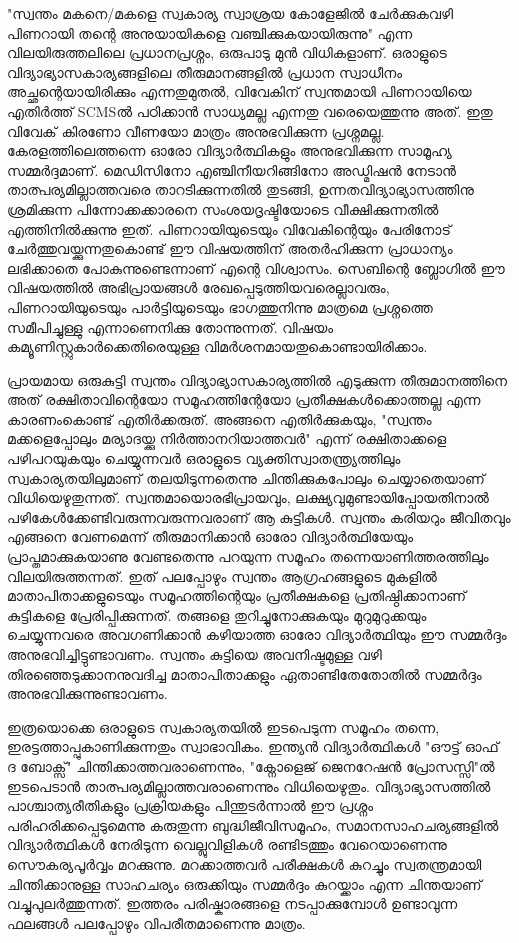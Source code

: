 "സ്വന്തം മകനെ/മകളെ സ്വകാര്യ സ്വാശ്രയ കോളേജില്‍ ചേര്‍ക്കുകവഴി പിണറായി തന്റെ അനുയായികളെ വഞ്ചിക്കുകയായിരുന്നു" എന്ന വിലയിരുത്തലിലെ പ്രധാനപ്രശ്നം, ഒരുപാടു മുന്‍ വിധികളാണ്. ഒരാളുടെ വിദ്യാഭ്യാസകാര്യങ്ങളിലെ തീരുമാനങ്ങളില്‍ പ്രധാന സ്വാധീനം അച്ഛന്റെയായിരിക്കും എന്നതുമുതല്‍, വിവേകിന് സ്വന്തമായി പിണറായിയെ എതിര്‍ത്ത് SCMSല്‍ പഠിക്കാന്‍ സാധ്യമല്ല എന്നതു വരെയെത്തുന്നു അത്. ഇതു വിവേക് കിരണോ വീണയോ മാത്രം അനുഭവിക്കുന്ന പ്രശ്നമല്ല. കേരളത്തിലെത്തന്നെ ഓരോ വിദ്യാര്‍ത്ഥികളും അനുഭവിക്കുന്ന സാമൂഹ്യ സമ്മര്‍ദ്ദമാണ്. മെഡിസിനോ എഞ്ചിനീയറിങ്ങിനോ അഡ്മിഷന്‍ നേടാന്‍ താത്പര്യമില്ലാത്തവരെ താറടിക്കുന്നതില്‍ തുടങ്ങി, ഉന്നതവിദ്യാഭ്യാസത്തിനു ശ്രമിക്കുന്ന പിന്നോക്കക്കാരനെ സംശയദൃഷ്ടിയോടെ വീക്ഷിക്കുന്നതില്‍ എത്തിനില്‍ക്കുന്നു ഇത്. പിണറായിയുടെയും വിവേകിന്റെയും പേരിനോട് ചേര്‍ത്തുവയ്ക്കുന്നതുകൊണ്ട് ഈ വിഷയത്തിന് അതര്‍ഹിക്കുന്ന പ്രാധാന്യം ലഭിക്കാതെ പോകുന്നുണ്ടെന്നാണ് എന്റെ വിശ്വാസം. സെബിന്റെ ബ്ലോഗില്‍ ഈ വിഷയത്തില്‍ അഭിപ്രായങ്ങള്‍ രേഖപ്പെടുത്തിയവരെല്ലാവരും, പിണറായിയുടെയും പാര്‍ട്ടിയുടെയും ഭാഗത്തുനിന്നു മാത്രമെ പ്രശ്നത്തെ സമീപിച്ചുള്ളു എന്നാണെനിക്കു തോന്നുന്നത്. വിഷയം കമ്യൂണിസ്റ്റുകാര്‍ക്കെതിരെയുള്ള വിമര്‍ശനമായതുകൊണ്ടായിരിക്കാം.

പ്രായമായ ഒരുകുട്ടി സ്വന്തം വിദ്യാഭ്യാസകാര്യത്തില്‍ എടുക്കുന്ന തീരുമാനത്തിനെ അത് രക്ഷിതാവിന്റെയോ സമൂഹത്തിന്റേയോ പ്രതീക്ഷകള്‍ക്കൊത്തല്ല എന്ന കാരണംകൊണ്ട് എതിര്‍ക്കരുത്. അങ്ങനെ എതിര്‍ക്കുകയും, "സ്വന്തം മക്കളെപ്പോലും മര്യാദയ്ക്കു നിര്‍ത്താനറിയാത്തവര്‍" എന്ന് രക്ഷിതാക്കളെ പഴിപറയുകയും ചെയ്യുന്നവര്‍ ഒരാളുടെ വ്യക്തിസ്വാതന്ത്ര്യത്തിലും സ്വകാര്യതയിലുമാണ് തലയിടുന്നതെന്നു ചിന്തിക്കുകപോലും ചെയ്യാതെയാണ് വിധിയെഴുതുന്നത്. സ്വന്തമായൊരഭിപ്രായവും, ലക്ഷ്യവുമുണ്ടായിപ്പോയതിനാല്‍ പഴികേള്‍ക്കേണ്ടിവരുന്നവരുന്നവരാണ് ആ കുട്ടികള്‍. സ്വന്തം കരിയറും ജീവിതവും എങ്ങനെ വേണമെന്ന് തീരുമാനിക്കാന്‍ ഓരോ വിദ്യാര്‍ത്ഥിയേയും പ്രാപ്തമാക്കുകയാണു വേണ്ടതെന്നു പറയുന്ന സമൂഹം തന്നെയാണിത്തരത്തിലും വിലയിരുത്തന്നത്. ഇത് പലപ്പോഴും സ്വന്തം ആഗ്രഹങ്ങളുടെ മുകളില്‍ മാതാപിതാക്കളുടെയും സമൂഹത്തിന്റെയും പ്രതീക്ഷകളെ പ്രതിഷ്ഠിക്കാനാണ് കുട്ടികളെ പ്രേരിപ്പിക്കുന്നത്. തങ്ങളെ തുറിച്ചുനോക്കുകയും മുറുമുറുക്കയും ചെയ്യുന്നവരെ അവഗണിക്കാന്‍ കഴിയാത്ത ഓരോ വിദ്യാര്‍ത്ഥിയും ഈ സമ്മര്‍ദ്ദം അനുഭവിച്ചിട്ടുണ്ടാവണം. സ്വന്തം കുട്ടിയെ അവനിഷ്ടമുള്ള വഴി തിരഞ്ഞെടുക്കാനനുവദിച്ച മാതാപിതാക്കളും ഏതാണ്ടിതേതോതില്‍ സമ്മര്‍ദ്ദം അനുഭവിക്കുന്നുണ്ടാവണം.

ഇത്രയൊക്കെ ഒരാളുടെ സ്വകാര്യതയില്‍ ഇടപെടുന്ന സമൂഹം തന്നെ, ഇരട്ടത്താപ്പുകാണിക്കുന്നതും സ്വാഭാവികം. ഇന്ത്യന്‍ വിദ്യാര്‍ത്ഥികള്‍ "ഔട്ട് ഓഫ് ദ ബോക്സ്" ചിന്തിക്കാത്തവരാണെന്നും, "ക്നോളെജ് ജെനറേഷന്‍ പ്രോസസ്സി"ല്‍ ഇടപെടാന്‍ താത്പര്യമില്ലാത്തവരാണെന്നും വിധിയെഴുതും. വിദ്യാഭ്യാസത്തില്‍ പാശ്ചാത്യരീതികളും പ്രക്രിയകളും പിന്തുടര്‍ന്നാല്‍ ഈ പ്രശ്നം പരിഹരിക്കപ്പെടുമെന്നു കരുതുന്ന ബുദ്ധിജീവിസമൂഹം, സമാനസാഹചര്യങ്ങളില്‍ വിദ്യാര്‍ത്ഥികള്‍ നേരിടുന്ന വെല്ലുവിളികള്‍ രണ്ടിടത്തും വേറെയാണെന്നു സൌകര്യപൂര്‍വ്വം മറക്കുന്നു. മറക്കാത്തവര്‍ പരീക്ഷകള്‍ കുറച്ചും സ്വതന്ത്രമായി ചിന്തിക്കാനുള്ള സാഹചര്യം ഒരുക്കിയും സമ്മര്‍ദ്ദം കുറയ്ക്കാം എന്ന ചിന്തയാണ് വച്ചുപുലര്‍ത്തുന്നത്. ഇത്തരം പരിഷ്കാരങ്ങളെ നടപ്പാക്കുമ്പോള്‍ ഉണ്ടാവുന്ന ഫലങ്ങള്‍ പലപ്പോഴും വിപരീതമാണെന്നു മാത്രം.

